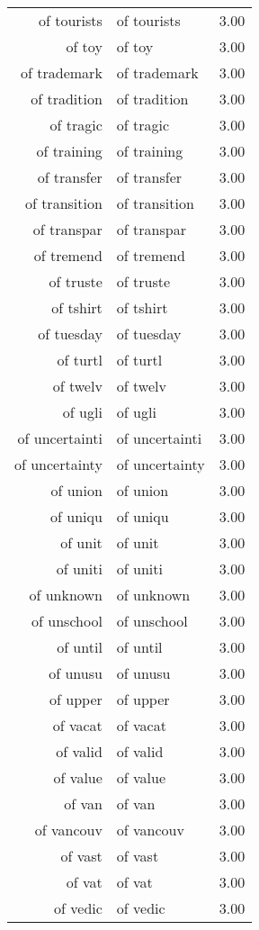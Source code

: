 \begin{table}[ht]
\begin{tabular}{rlr}
  of tourists & of tourists & 3.00 \\ 
  of toy & of toy & 3.00 \\ 
  of trademark & of trademark & 3.00 \\ 
  of tradition & of tradition & 3.00 \\ 
  of tragic & of tragic & 3.00 \\ 
  of training & of training & 3.00 \\ 
  of transfer & of transfer & 3.00 \\ 
  of transition & of transition & 3.00 \\ 
  of transpar & of transpar & 3.00 \\ 
  of tremend & of tremend & 3.00 \\ 
  of truste & of truste & 3.00 \\ 
  of tshirt & of tshirt & 3.00 \\ 
  of tuesday & of tuesday & 3.00 \\ 
  of turtl & of turtl & 3.00 \\ 
  of twelv & of twelv & 3.00 \\ 
  of ugli & of ugli & 3.00 \\ 
  of uncertainti & of uncertainti & 3.00 \\ 
  of uncertainty & of uncertainty & 3.00 \\ 
  of union & of union & 3.00 \\ 
  of uniqu & of uniqu & 3.00 \\ 
  of unit & of unit & 3.00 \\ 
  of uniti & of uniti & 3.00 \\ 
  of unknown & of unknown & 3.00 \\ 
  of unschool & of unschool & 3.00 \\ 
  of until & of until & 3.00 \\ 
  of unusu & of unusu & 3.00 \\ 
  of upper & of upper & 3.00 \\ 
  of vacat & of vacat & 3.00 \\ 
  of valid & of valid & 3.00 \\ 
  of value & of value & 3.00 \\ 
  of van & of van & 3.00 \\ 
  of vancouv & of vancouv & 3.00 \\ 
  of vast & of vast & 3.00 \\ 
  of vat & of vat & 3.00 \\ 
  of vedic & of vedic & 3.00 \\ 

\end{tabular}
\end{table}
